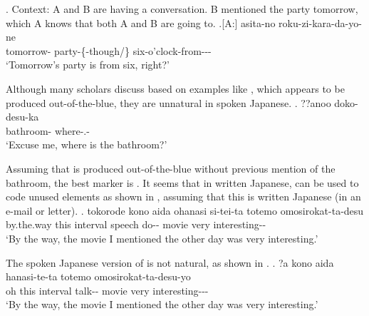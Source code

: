 %
\ex. Context: A and B are having a conversation. B mentioned the party tomorrow, which A knows that both A and B are going to.
	\ag.[A:] asita-no  roku-zi-kara-da-yo-ne \\
		tomorrow- party-\{-though/\} six-o'clock-from--\ab{fp}- \\
		`Tomorrow's party is from six, right?' 


Although many scholars discuss  based on examples like \Next,
which appears to be produced out-of-the-blue,
they are unnatural in spoken Japanese.
%
\exg. ??anoo  doko-desu-ka \\
	 bathroom- where-.- \\
	`Excuse me, where is the bathroom?'

Assuming that \Last is produced out-of-the-blue without previous mention of the bathroom,
the best marker is \ci{\O}.
It seems that in written Japanese,
 can be used to code unused elements as shown in \Next,
assuming that this is written Japanese (in an e-mail or letter).
%
\exg. tokorode kono aida ohanasi si-tei-ta  totemo omosirokat-ta-desu \\
	by.the.way this interval speech do-- movie
 very interesting-- \\
 `By the way, the movie I mentioned the other day was very interesting.'

The spoken Japanese version of \Last is not natural, as shown in \Next.
%
\exg. ?a kono aida hanasi-te-ta  totemo omosirokat-ta-desu-yo \\
	oh this interval talk-- movie
 very interesting--- \\
 `By the way, the movie I mentioned the other day was very interesting.'

